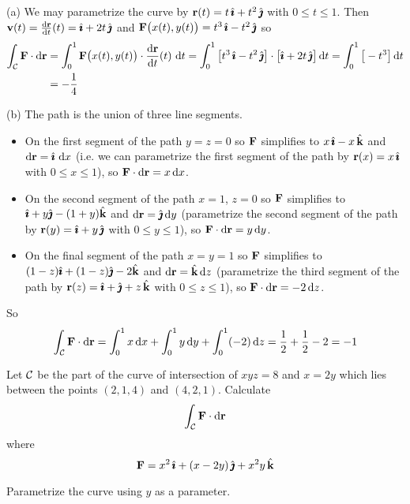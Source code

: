 \begin{solution}
(a) 
We may parametrize the curve by $\mathbf{r}(t)=t\,\hat{\pmb{\imath}}+t^2\,\hat{\pmb{\jmath}}$ with $0\le t\le 1$.
Then $\vv(t)=\diff{\vr}{t}(t)=\hi+2t\,\hj$ and 
$\mathbf{F}\big(x(t),y(t)\big)=t^3\,\hat{\pmb{\imath}}-t^2\,\hat{\pmb{\jmath}}$ so
\begin{align*}
\int_\cC\vF\cdot \dee{\vr}
&=\int_0^1 \vF\big(x(t),y(t)\big)\cdot \diff{\vr}{t}(t)\ \dee{t}
=\int_0^1\big[t^3\,\hi-t^2\,\hj\big]
\cdot\big[\hi+2t\,\hj\big]\,\dee{t}
=\int_0^1\big[-t^3\big]\,\dee{t} \\
&=-\frac{1}{4}
\end{align*}

(b) The path is the union of three line segments.
\begin{itemize}\itemsep1pt \parskip0pt  %
\item
On the first segment of the path $y=z=0$ so $\mathbf{F}$ simplifies
to $x\,\hat{\pmb{\imath}}-x\,\hat{\mathbf{k}}$ and $\mathrm{d}\mathbf{r}=\hat{\pmb{\imath}}\ \mathrm{d}x$ (i.e. we can parametrize
the first segment of the path by $\mathbf{r}(x)=x\,\hat{\pmb{\imath}}$ with $0\le x\le 1$),
so $\mathbf{F}\cdot \mathrm{d}\mathbf{r}=x\,\mathrm{d}x$. 
\item
On the second segment of the path $x=1$, $z=0$ so $\mathbf{F}$ simplifies
to $\hat{\pmb{\imath}}+y\hat{\pmb{\jmath}}-(1+y)\hat{\mathbf{k}}$ and $\mathrm{d}\mathbf{r}=\hat{\pmb{\jmath}}\, \mathrm{d}y$
(parametrize the second segment of the path by $
\mathbf{r}(y)=\hat{\pmb{\imath}}+y\,\hat{\pmb{\jmath}}$ with $0\le y\le 1$),
so $\mathbf{F}\cdot \mathrm{d}\mathbf{r}=y\,\mathrm{d}y$.
\item
On the final segment of the path $x=y=1$ so $\mathbf{F}$ simplifies
to $(1-z)\hat{\pmb{\imath}}+(1-z)\hat{\pmb{\jmath}}-2\hat{\mathbf{k}}$ and $\mathrm{d}\mathbf{r}=\hat{\mathbf{k}}\, \mathrm{d}z$
(parametrize the third segment of the path by $
\mathbf{r}(z)=\hat{\pmb{\imath}}+\hat{\pmb{\jmath}}+z\,\hat{\mathbf{k}}$ with $0\le z\le 1$),
so $\mathbf{F}\cdot \mathrm{d}\mathbf{r}=-2\,\mathrm{d}z$.
\end{itemize}
So
\begin{equation*}
\int_{\mathcal{C}}\mathbf{F}\cdot \mathrm{d}\mathbf{r}=\int_0^1 x\,\mathrm{d}x
           +\int_0^1 y\,\mathrm{d}y+\int_0^1(-2)\,\mathrm{d}z
=\frac{1}{2}+\frac{1}{2}-2
=-1
\end{equation*}
\end{solution}

\begin{question}[M317 1998D] %
Let $\mathcal{C}$ be the part of the curve of intersection of $xyz=8$
and $x=2y$ which lies between the points $(2,1,4)$ and $(4,2,1)$. Calculate
$$
\int_{\mathcal{C}} \mathbf{F}\cdot \mathrm{d}\mathbf{r}
$$
where
$$
\mathbf{F} = x^2\,\hat{\pmb{\imath}}+(x-2y)\,\hat{\pmb{\jmath}}+x^2 y\,\hat{\mathbf{k}}
$$
\end{question}

\begin{hint} 
Parametrize the curve using $y$ as a parameter. 
\end{hint}

